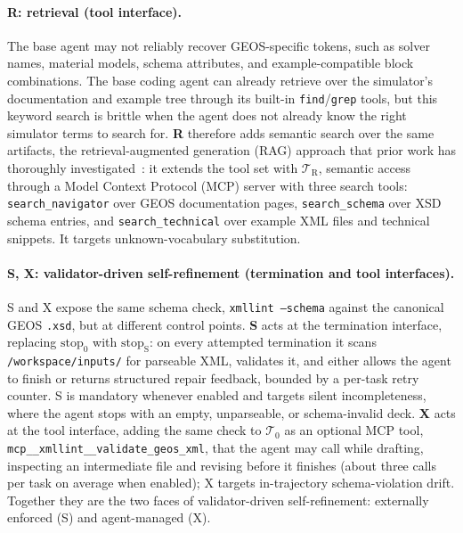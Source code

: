 \documentclass{article}
\begin{document}
\paragraph{R: retrieval (tool interface).} The base agent may not reliably recover GEOS-specific tokens, such as solver names, material models, schema attributes, and example-compatible block combinations. The base coding agent can already retrieve over the simulator's documentation and example tree through its built-in \texttt{find}/\texttt{grep} tools, but this keyword search is brittle when the agent does not already know the right simulator terms to search for. \textbf{R} therefore adds semantic search over the same artifacts, the retrieval-augmented generation (RAG) approach that prior work has thoroughly investigated~\citep{lewis2021rag}: it extends the tool set with $\mathcal{T}_{\mathrm{R}}$, semantic access through a Model Context Protocol (MCP) server with three search tools: \texttt{search\_navigator} over GEOS documentation pages, \texttt{search\_schema} over XSD schema entries, and \texttt{search\_technical} over example XML files and technical snippets. It targets unknown-vocabulary substitution.

\paragraph{S, X: validator-driven self-refinement (termination and tool interfaces).} S and X expose the same schema check, \texttt{xmllint --schema} against the canonical GEOS \texttt{.xsd}, but at different control points. \textbf{S} acts at the termination interface, replacing $\mathrm{stop}_0$ with $\mathrm{stop}_{\mathrm{S}}$: on every attempted termination it scans \texttt{/workspace/inputs/} for parseable XML, validates it, and either allows the agent to finish or returns structured repair feedback, bounded by a per-task retry counter. S is mandatory whenever enabled and targets silent incompleteness, where the agent stops with an empty, unparseable, or schema-invalid deck. \textbf{X} acts at the tool interface, adding the same check to $\mathcal{T}_0$ as an optional MCP tool, \texttt{mcp\_\_xmllint\_\_validate\_geos\_xml}, that the agent may call while drafting, inspecting an intermediate file and revising before it finishes (about three calls per task on average when enabled); X targets in-trajectory schema-violation drift. Together they are the two faces of validator-driven self-refinement: externally enforced (S) and agent-managed (X).
\end{document}
